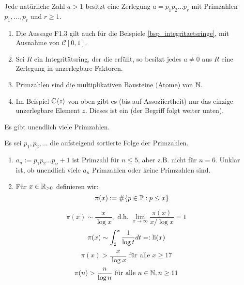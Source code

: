 \setcounter{falko}{2}
\begin{falko} \label{F1.3'}
	Jede natürliche Zahl $a > 1$ besitzt eine Zerlegung $a = p_1p_2 \dots p_r$ mit Primzahlen $p_1,\dots,p_r$ und $r \geq 1$.
\end{falko}

	\begin{enumerate}[1)]
		\item Die Aussage F1.3 gilt auch für die Beispiele \ref{bsp_integritaetsringe}, mit Ausnahme von $\mathcal{C}[0,1]$.
		\item Sei $R$ ein Integritätsring, der die  erfüllt, so besitzt jedes $a \neq 0$ aus $R$ eine Zerlegung in unzerlegbare Faktoren.
		\item Primzahlen sind die multiplikativen Bausteine (Atome) von $\mathbb{N}$.
		\item Im Beispiel $\mathbb{C}\langle z\rangle$ von oben gibt es (bis auf Assoziiertheit) nur das einzige unzerlegbare Element $z$. Dieses ist ein  (der Begriff folgt weiter unten).
	\end{enumerate}
	
\begin{satz} \label{satz_1.1}
	Es gibt unendlich viele Primzahlen.
\end{satz}

	Es sei $p_1,p_2,\dots$ die aufsteigend sortierte Folge der Primzahlen.
	\begin{enumerate}[1)]
		\item $a_n := p_1p_2\dots p_n +1$ ist Primzahl für $n \leq 5$, aber z.B. nicht für $n = 6$. Unklar ist, ob unendlich viele $a_n$ Primzahlen oder keine Primzahlen sind.
		\item Für $x \in \mathbb{R}_{>0}$ definieren wir:
		\[ \pi(x) := \# \{p \in \mathbb{P} : p \leq x\}\]
	\end{enumerate}

	\begin{equation}
		\pi(x) \sim \frac{x}{\log x}, \text{ d.h. } \lim\limits_{x \rightarrow \infty} \frac{\pi(x)}{x / \log x} = 1 \label{eq_primzahlsatz1}
	\end{equation}
	\begin{equation}
		\pi(x) \sim \int_{2}^{x} \frac{1}{\log t} dt =: \operatorname{li}(x) \label{eq_primzahlsatz_2}
	\end{equation}
	\begin{equation}
	\pi(x) > \frac{x}{\log x} \text{ für alle } x \geq 17 \label{eq_primzahlsatz_3}
	\end{equation}
	\begin{equation}
	\pi(n) > \frac{n}{\log n} \text{ für alle } n \in \mathbb{N}, n \geq 11 \label{eq_primzahlsatz_4}
	\end{equation}
	
